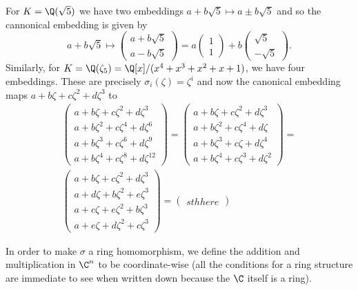 \begin{example}
	For $K = \Q(\sqrt{5})$ we have two embeddings $a+b\sqrt{5} \mapsto a \pm b\sqrt{5}$ and so the cannonical embedding is given by
	\[ a + b\sqrt{5} \mapsto \begin{pmatrix} a + b\sqrt{5} \\ a - b\sqrt{5} \end{pmatrix} = 
	a \begin{pmatrix} 1 \\ 1 \end{pmatrix} + b \begin{pmatrix} \sqrt{5} \\ -\sqrt{5} \end{pmatrix}. \]
	Similarly, for $K = \Q(\zeta_5) = \Q[x]/(x^4 +x^3 +x^2+x +1)$, we have four embeddings. These are precisely $\sigma_i(\zeta) = \zeta^i$ and now the canonical embedding maps $a + b\zeta + c\zeta^2 + d\zeta^3$ to
	\begin{align*}
		\begin{pmatrix}
		a + b\zeta + c\zeta^2 +d \zeta^3 \\
		a + b\zeta^2 + c\zeta^4 +d \zeta^6 \\
		a + b\zeta^3 + c\zeta^6 +d \zeta^9 \\
		a + b\zeta^4 + c\zeta^8 +d \zeta^{12}
		\end{pmatrix} = \begin{pmatrix}
		a + b\zeta + c\zeta^2 + d\zeta^3 \\
		a + b\zeta^2 + c\zeta^4 + d\zeta \\ 
		a + b\zeta^3 + c\zeta + d\zeta^4 \\
		a + b\zeta^4 + c\zeta^3 + d\zeta^2
		\end{pmatrix} = \\
		\begin{pmatrix}
		a + b\zeta + c\zeta^2 + d\zeta^3 \\
		a + d\zeta + b\zeta^2 + e\zeta^3 \\
		a + c\zeta + e\zeta^2 + b\zeta^3  \\
		a + e\zeta + d\zeta^2 + c\zeta^3 
		\end{pmatrix} = \begin{pmatrix} sth here
	\end{pmatrix}
	\end{align*}
\end{example}

In order to make $\sigma$ a ring homomorphism, we define the addition and multiplication in $\C^n$ to be coordinate-wise (all the conditions for a ring structure are immediate to see when written down because the $\C$ itself is a ring).

